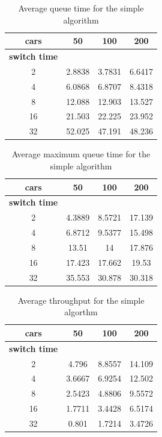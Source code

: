 \documentclass[a4paper,11pt]{article}
\begin{document}
\begin{table}[htb]
\centering
\begin{tabular}{cccc}
\hline
\textbf{cars} & 50 & 100 & 200\\
\hline
\textbf{switch time} & & & \\
2 & 2.8838 & 3.7831 & 6.6417 \\
4 & 6.0868 & 6.8707 & 8.4318 \\
8 & 12.088 & 12.903 & 13.527 \\
16 & 21.503 & 22.225 & 23.952 \\
32 & 52.025 & 47.191 & 48.236 \\
\hline
\end{tabular}
\caption{Average queue time for the simple algorithm}
\end{table}

\begin{table}[htb]
\centering
\begin{tabular}{cccc}
\hline
\textbf{cars} & 50 & 100 & 200\\
\hline
\textbf{switch time} & & & \\
2 & 4.3889 & 8.5721 & 17.139 \\
4 & 6.8712 & 9.5377 & 15.498 \\
8 & 13.51 & 14 & 17.876 \\
16 & 17.423 & 17.662 & 19.53 \\
32 & 35.553 & 30.878 & 30.318 \\
\hline
\end{tabular}
\caption{Average maximum queue time for the simple algorithm}
\end{table}

\begin{table}[htb]
\centering
\begin{tabular}{cccc}
\hline
\textbf{cars} & 50 & 100 & 200\\
\hline
\textbf{switch time} & & & \\
2 & 4.796 & 8.8557 & 14.109 \\
4 & 3.6667 & 6.9254 & 12.502 \\
8 & 2.5423 & 4.8806 & 9.5572 \\
16 & 1.7711 & 3.4428 & 6.5174 \\
32 & 0.801 & 1.7214 & 3.4726 \\
\hline
\end{tabular}
\caption{Average throughput for the simple algorthm}
\end{table}
\end{document}
